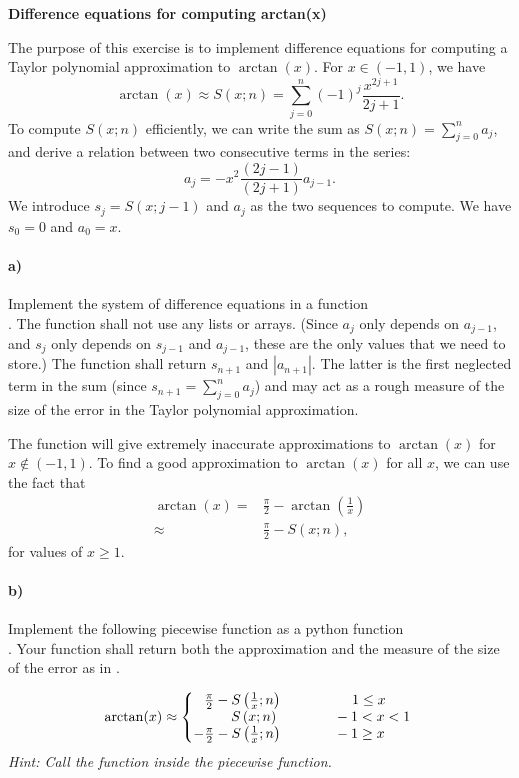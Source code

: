 \begin{Problem}
{\textbf{Difference equations for computing arctan(x)}}

\noindent 
The purpose of this exercise is to implement difference equations for computing a Taylor polynomial approximation to $\arctan(x)$. For $x \in (-1, 1)$, we have
$$
\arctan(x) \approx S(x;n) = \sum_{j=0}^{n}(-1)^j\frac{x^{2j+1}}{2j+1}.
$$
To compute $S(x;n)$ efficiently, we can write the sum as $S(x;n)=\sum_{j=0}^{n}a_j$, and derive a relation between two consecutive terms in the series:
$$
a_j = -x^2\frac{(2j-1)}{(2j+1)}a_{j-1}.
$$
We introduce $s_j=S(x;j-1)$ and $a_j$ as the two sequences to compute. We have $s_0=0$ and $a_0=x$.
\paragraph{a)}
Implement the system of difference equations in a function\\ . The function shall not use any lists or arrays. (Since $a_j$ only depends on $a_{j-1}$, and $s_j$ only depends on $s_{j-1}$ and $a_{j-1}$, these are the only values that we need to store.) The function shall return $s_{n+1}$ and $|a_{n+1}|$. The latter is the first neglected term in the sum (since $s_{n+1}=\sum_{j=0}^{n}a_j$) and may act as a rough measure of the size of the error in the Taylor polynomial approximation.  
\bigskip

The function  will give extremely inaccurate approximations to $\arctan(x)$ for $x\not\in (-1, 1)$. To find a good approximation to $\arctan(x)$ for all $x$, we can use the fact that 
\begin{align*}
\arctan(x) =& \frac{\pi}{2} - \arctan \left(\frac{1}{x}\right)\\
\approx& \frac{\pi}{2} - S(x;n),
\end{align*}
for values of $x\geq1$.
\paragraph{b)}
Implement the following piecewise function as a python function\\ . Your function shall return both the approximation and the measure of the size of the error as in .


\[
  \arctan(x)\approx \left\{
     \begin{array}{@{}l@{\thinspace}l}
      \hspace*{2.7mm} \frac{\pi}{2} - S\left(\frac{1}{x};n\right)  \hspace*{17.5mm}  1 \leq x \\
        \hspace*{9.5mm}S\left(x;n\right) \hspace*{14.5mm} -1 < x < 1\\
       -\frac{\pi}{2} - S\left(\frac{1}{x};n\right)  \hspace*{13.5mm} -1 \geq x \\
     \end{array}
   \right.
\]
\emph{Hint: Call the function  inside the piecewise function.}

\end{Problem}
